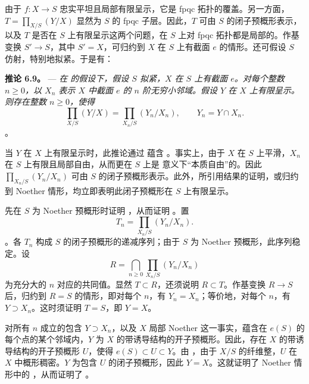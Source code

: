 由于 \(f:X\to S\) 忠实平坦且局部有限呈示，它是 fpqc 拓扑的覆盖。另一方面，\(T=\prod_{X/S}(Y/X)\) 显然为 \(S\) 的 fpqc 子层。因此，\(T\) 可由 \(S\) 的闭子预概形表示，以及 \(T\) 是否在 \(S\) 上有限呈示这两个问题，在 \(S\) 上对 fpqc 拓扑都是局部的。作基变换 \(S'\to S\)，其中 \(S'=X\)，可归约到 \(X\) 在 \(S\) 上有截面 \(e\) 的情形。还可假设 \(S\) 仿射，特别地拟紧。于是有：

\medskip\noindent{}\textbf{推论 6.9。} --- \textit{在  的假设下，假设 \(S\) 拟紧，\(X\) 在 \(S\) 上有截面 \(e\)。对每个整数 \(n\geq0\)，以 \(X_n\) 表示 \(X\) 中截面 \(e\) 的 \(n\) 阶无穷小邻域。假设 \(Y\) 在 \(X\) 上有限呈示。则存在整数 \(n\geq0\)，使得}  \[
  \prod_{X/S}(Y/X)
  =
  \prod_{X_n/S}(Y_n/X_n),
  \qquad Y_n=Y\cap X_n.
\]。

当 \(Y\) 在 \(X\) 上有限呈示时，此推论通过  蕴含 。事实上，由于 \(X\) 在 \(S\) 上平滑，\(X_n\) 在 \(S\) 上有限且局部自由，从而更在 \(S\) 上是  意义下“本质自由”的。因此 \(\prod_{X_n/S}(Y_n/X_n)\) 可由 \(S\) 的闭子预概形表示。此外，所引用结果的证明，或归约到 Noether 情形，均立即表明此闭子预概形在 \(S\) 上有限呈示。

先在 \(S\) 为 Noether 预概形时证明 ，从而证明 。置  \[
  T_n=\prod_{X_n/S}(Y_n/X_n).
\]。各 \(T_n\) 构成 \(S\) 的闭子预概形的递减序列；由于 \(S\) 为 Noether 预概形，此序列稳定。设  \[
  R=\bigcap_{n\geq0}\prod_{X_n/S}(Y_n/X_n)
\] 为充分大的 \(n\) 对应的共同值。显然 \(T\subset R\)，还须说明 \(R\subset T\)。作基变换 \(R\to S\) 后，归约到 \(R=S\) 的情形，即对每个 \(n\)，有 \(Y_n=X_n\)；等价地，对每个 \(n\)，有 \(Y\supset X_n\)。这时须证明 \(T=S\)，即 \(Y=X\)。

对所有 \(n\) 成立的包含 \(Y\supset X_n\)，以及 \(X\) 局部 Noether 这一事实，蕴含在 \(e(S)\) 的每个点的某个邻域内，\(Y\) 为 \(X\) 的带诱导结构的开子预概形。因此，存在 \(X\) 的带诱导结构的开子预概形 \(U\)，使得 \(e(S)\subset U\subset Y\)。由 ，由于 \(X/S\) 的纤维整，\(U\) 在 \(X\) 中概形稠密。\(Y\) 为包含 \(U\) 的闭子预概形，因此 \(Y=X\)。这就证明了 Noether 情形中的 ，从而证明了 。


